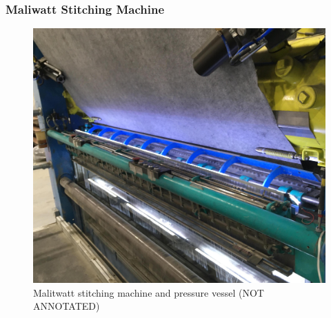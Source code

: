 \documentclass[12pt]{report}
\begin{document}
        \subsubsection{Maliwatt Stitching Machine}
\begin{figure}[ht]
    \centering
    \includegraphics[width=\textwidth]{figures/background/maliwatt_far_crop.jpeg}
    \caption{Malitwatt stitching machine and pressure vessel (NOT ANNOTATED)}
    \label{fig:malitwatt_front}
\end{figure}
\end{document}

